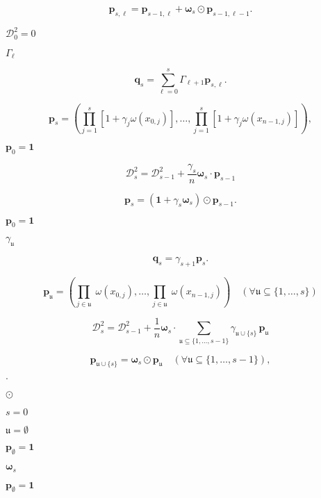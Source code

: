 \documentclass{article}
\begin{document}
\[   \boldsymbol p_{s,\ell} =
      \boldsymbol p_{s-1,\ell} + \boldsymbol\omega_s \odot \boldsymbol p_{s-1,\ell-1}.
\]
\pagebreak

$\mathcal D_0^2 = 0$
\pagebreak

$ \Gamma_\ell $
\pagebreak

\[   \boldsymbol q_s = \sum_{\ell=0}^s \Gamma_{\ell+1} \boldsymbol p_{s,\ell}.
\]
\pagebreak

\[  \boldsymbol p_s = \left(
     \prod_{j=1}^s
     \left[ 1 + \gamma_j \omega(x_{0,j}) \right],
     \dots,
     \prod_{j=1}^s
     \left[ 1 + \gamma_j \omega(x_{n-1,j}) \right]
     \right),
\]
\pagebreak

$\boldsymbol p_0 = \boldsymbol 1$
\pagebreak

\[   \mathcal D_s^2 = \mathcal D_{s-1}^2 +
   \frac{\gamma_s}{n} \boldsymbol\omega_s \cdot \boldsymbol p_{s-1}
\]
\pagebreak

\[   \boldsymbol p_s =
      (\boldsymbol 1 + \gamma_s \boldsymbol\omega_s) \odot \boldsymbol p_{s-1}.
\]
\pagebreak

$\boldsymbol p_0 = \boldsymbol
1$
\pagebreak

$ \gamma_{\mathfrak u} $
\pagebreak

\[   \boldsymbol q_s = \gamma_{s+1} \boldsymbol p_s.
\]
\pagebreak

\[  \boldsymbol p_{\mathfrak u} = \left(
     \prod_{j \in \mathfrak u} \; \omega(x_{0,j}),
     \dots,
     \prod_{j \in \mathfrak u} \; \omega(x_{n-1,j})
     \right)
   \quad (\forall \mathfrak u \subseteq \{1,\dots,s\})
\]
\pagebreak

\[   \mathcal D_s^2 = \mathcal D_{s-1}^2 +
   \frac1n \boldsymbol\omega_s \cdot
   \sum_{\mathfrak u \subseteq \{1,\dots,s-1\}}
   \gamma_{\mathfrak u \cup \{s\}}
   \, \boldsymbol p_{\mathfrak u}
\]
\pagebreak

\[   \boldsymbol p_{\mathfrak u \cup \{s\}} =
      \boldsymbol\omega_s \odot \boldsymbol p_{\mathfrak u}
      \quad (\forall \mathfrak u \subseteq \{1,\dots,s-1\}),
\]
\pagebreak

$\cdot$
\pagebreak

$\odot$
\pagebreak

$s=0$
\pagebreak

$\mathfrak u = \emptyset$
\pagebreak

$\boldsymbol p_{\emptyset} = \boldsymbol 1$
\pagebreak

$\boldsymbol \omega_s$
\pagebreak

$\boldsymbol p_{\emptyset} =
\boldsymbol 1$
\pagebreak
\end{document}
